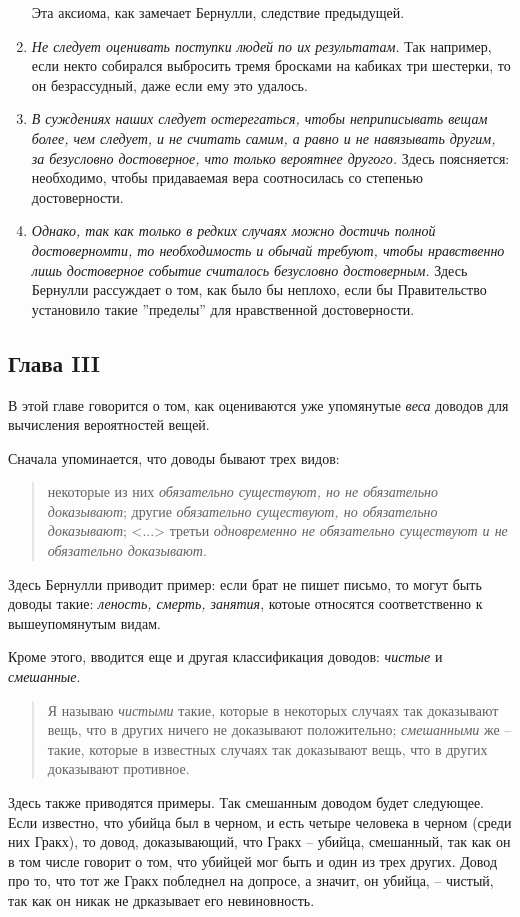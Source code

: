 \documentclass[12pt]{article}
\begin{document}
\begin{enumerate}
	Эта аксиома, как замечает Бернулли, следствие предыдущей.
	\item \textit{Не следует оценивать поступки людей по их результатам.}
	Так например, если некто собирался выбросить тремя бросками на кабиках три шестерки, то он безрассудный, даже если ему это удалось.
	\item \textit{В суждениях наших следует остерегаться, чтобы неприписывать вещам более, чем следует, и не считать самим, а равно и не навязывать другим, за безусловно достоверное, что только вероятнее другого.}
	Здесь поясняется: необходимо, чтобы придаваемая вера соотносилась со степенью достоверности.
	\item \textit{Однако, так как только в редких случаях можно достичь полной достоверномти, то необходимость и обычай требуют, чтобы нравственно лишь достоверное событие считалось безусловно достоверным.}
	Здесь Бернулли рассуждает о том, как было бы неплохо, если бы Правительство установило такие ''пределы'' для нравственной достоверности.
\end{enumerate}

\subsection{Глава III}
В этой главе говорится о том, как оцениваются уже упомянутые \textit{веса} доводов для вычисления вероятностей вещей.

Сначала упоминается, что доводы бывают трех видов:
\begin{quote}
	некоторые из них \textit{обязательно существуют, но не обязательно доказывают};
	другие \textit{обязательно существуют, но обязательно доказывают};
	<...> третьи \textit{одновременно не обязательно существуют и не обязательно доказывают}.
\end{quote}
Здесь Бернулли приводит пример: если брат не пишет письмо, то могут быть доводы такие: \textit{леность, смерть, занятия}, котоые относятся соответственно к вышеупомянутым видам.

Кроме этого, вводится еще и другая классификация доводов: \textit{чистые} и \textit{смешанные}.
\begin{quote}
	Я называю \textit{чистыми} такие, которые в некоторых случаях так доказывают вещь, что в других ничего не доказывают положительно; 
	\textit{смешанными} же -- такие, которые в известных случаях так доказывают вещь, что в других доказывают противное.
\end{quote}
Здесь также приводятся примеры. 
Так смешанным доводом будет следующее. Если известно, что убийца был в черном, и есть четыре человека в черном (среди них Гракх), то довод, доказывающий, что Гракх -- убийца, смешанный, так как он в том числе говорит о том, что убийцей мог быть и один из трех других.
Довод про то, что тот же Гракх побледнел на допросе, а значит, он убийца,  -- чистый, так как он никак не дрказывает его невиновность.
\end{document}
